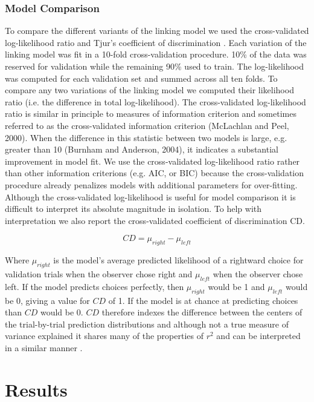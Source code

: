 \documentclass{report}
\begin{document}
\subsubsection{Model Comparison}

To compare the different variants of the linking model we used the cross-validated log-likelihood ratio and Tjur’s coefficient of discrimination \citep{Tjur2009-az}. Each variation of the linking model was fit in a 10-fold cross-validation procedure. 10\% of the data was reserved for validation while the remaining 90\% used to train. The log-likelihood was computed for each validation set and summed across all ten folds. To compare any two variations of the linking model we computed their likelihood ratio (i.e. the difference in total log-likelihood). The cross-validated log-likelihood ratio is similar in principle to measures of information criterion and sometimes referred to as the cross-validated information criterion (McLachlan and Peel, 2000). When the difference in this statistic between two models is large, e.g. greater than 10 (Burnham and Anderson, 2004), it indicates a substantial improvement in model fit. We use the cross-validated log-likelihood ratio rather than other information criterions (e.g. AIC, or BIC) because the cross-validation procedure already penalizes models with additional parameters for over-fitting. Although the cross-validated log-likelihood is useful for model comparison it is difficult to interpret its absolute magnitude in isolation. To help with interpretation we also report the cross-validated coefficient of discrimination CD. 

\begin{equation}
    CD=\mu_{right}-\mu_{left}
\end{equation}

Where $\mu_{right}$ is the model’s average predicted likelihood of a rightward choice for validation trials when the observer chose right and $\mu_{left}$ when the observer chose left. If the model predicts choices perfectly, then $\mu_{right}$ would be 1 and $\mu_{left}$ would be 0, giving a value for $CD$ of 1. If the model is at chance at predicting choices than $CD$ would be 0. $CD$ therefore indexes the difference between the centers of the trial-by-trial prediction distributions and although not a true measure of variance explained it shares many of the properties of $r^2$ and can be interpreted in a similar manner \citep{Tjur2009-az}.

\section{Results}
\end{document}

